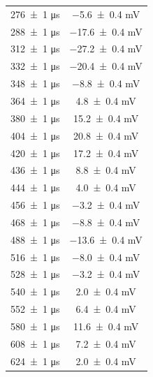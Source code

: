 \documentclass[a4paper]{article}
\begin{document}
\begin{appendices}
\begin{table}[htbp]
\begin{minipage}{0.48\textwidth}
\begin{tabular}{|c|c|}
        \num{276 \pm 1} \si{\micro\second} & \num{-5.6 \pm 0.4} \si{\milli\volt} \\
        \num{288 \pm 1} \si{\micro\second} & \num{-17.6 \pm 0.4} \si{\milli\volt} \\
        \num{312 \pm 1} \si{\micro\second} & \num{-27.2 \pm 0.4} \si{\milli\volt} \\
        \num{332 \pm 1} \si{\micro\second} & \num{-20.4 \pm 0.4} \si{\milli\volt} \\
        \num{348 \pm 1} \si{\micro\second} & \num{-8.8 \pm 0.4} \si{\milli\volt} \\
        \num{364 \pm 1} \si{\micro\second} & \num{4.8 \pm 0.4} \si{\milli\volt} \\
        \num{380 \pm 1} \si{\micro\second} & \num{15.2 \pm 0.4} \si{\milli\volt} \\
        \num{404 \pm 1} \si{\micro\second} & \num{20.8 \pm 0.4} \si{\milli\volt} \\
        \num{420 \pm 1} \si{\micro\second} & \num{17.2 \pm 0.4} \si{\milli\volt} \\
        \num{436 \pm 1} \si{\micro\second} & \num{8.8 \pm 0.4} \si{\milli\volt} \\
        \num{444 \pm 1} \si{\micro\second} & \num{4.0 \pm 0.4} \si{\milli\volt} \\
        \num{456 \pm 1} \si{\micro\second} & \num{-3.2 \pm 0.4} \si{\milli\volt} \\
        \num{468 \pm 1} \si{\micro\second} & \num{-8.8 \pm 0.4} \si{\milli\volt} \\
        \num{488 \pm 1} \si{\micro\second} & \num{-13.6 \pm 0.4} \si{\milli\volt} \\
        \num{516 \pm 1} \si{\micro\second} & \num{-8.0 \pm 0.4} \si{\milli\volt} \\
        \num{528 \pm 1} \si{\micro\second} & \num{-3.2 \pm 0.4} \si{\milli\volt} \\
        \num{540 \pm 1} \si{\micro\second} & \num{2.0 \pm 0.4} \si{\milli\volt} \\
        \num{552 \pm 1} \si{\micro\second} & \num{6.4 \pm 0.4} \si{\milli\volt} \\
        \num{580 \pm 1} \si{\micro\second} & \num{11.6 \pm 0.4} \si{\milli\volt} \\
        \num{608 \pm 1} \si{\micro\second} & \num{7.2 \pm 0.4} \si{\milli\volt} \\
        \num{624 \pm 1} \si{\micro\second} & \num{2.0 \pm 0.4} \si{\milli\volt} \\

\end{tabular}
\end{minipage}
\end{table}
\end{appendices}
\end{document}
